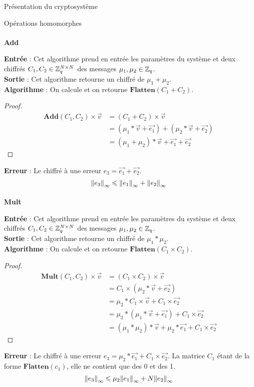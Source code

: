 \begin{section}{Présentation du cryptosystème}
\begin{subsection}{Opérations homomorphes}
	\paragraph{}
	\textbf{Add}
	\flushleft
	
	\textbf{Entrée} : Cet algorithme prend en entrée les paramètres du système et deux chiffrés $C_1, C_2 \in \mathbb{Z}_q^{N \times N}$ des messages $\mu_1, \mu_2 \in \mathbb{Z}_q$.\\
	\textbf{Sortie} : Cet algorithme retourne un chiffré de $\mu_1 + \mu_2$.\\
	\textbf{Algorithme} : On calcule et on retourne $\textbf{Flatten}(C_1 + C_2)$.
	\begin{proof}
	\begin{align*}
	\textbf{Add}(C_1, C_2) \times \vec{v} &= (C_1 + C_2) \times \vec{v} \\
	&= (\mu_1 * \vec{v} + \vec{e_1}) + (\mu_2 * \vec{v} + \vec{e_2}) \\
	&= (\mu_1 + \mu_2) * \vec{v} + \vec{e_1} + \vec{e_2}
	\end{align*}
	\end{proof}
\textbf{Erreur} : Le chiffré à une erreur $e_3 = \vec{e_1} + \vec{e_2}$.
\[{\|e_3\|}_{\infty} \leqslant {\|e_1\|}_{\infty} + {\|e_2\|}_{\infty}\]
	\paragraph{}
	\textbf{Mult}
	\flushleft
	
	\textbf{Entrée} : Cet algorithme prend en entrée les paramètres du système et deux chiffrés $C_1, C_2 \in \mathbb{Z}_q^{N \times N}$ des messages $\mu_1, \mu_2 \in \mathbb{Z}_q$.\\
	\textbf{Sortie} : Cet algorithme retourne un chiffré de $\mu_1 * \mu_2$. \\
	\textbf{Algorithme} : On calcule et on retourne $\textbf{Flatten}(C_1 \times C_2)$.
	\begin{proof}
	\begin{align*}
	\textbf{Mult}(C_1, C_2) \times \vec{v} &= (C_1 \times C_2) \times \vec{v} \\
	&= C_1 \times (\mu_2 * \vec{v} + \vec{e_2}) \\
	&= \mu_2 * C_1 \times \vec{v} + C_1 \times \vec{e_2} \\
	&= \mu_2 * (\mu_1 * \vec{v} + \vec{e_1}) + C_1 \times \vec{e_2} \\
	&= (\mu_1 * \mu_2) * \vec{v} + \mu_2 * \vec{e_1} + C_1 \times \vec{e_2}
	\end{align*}
	\end{proof}
	\textbf{Erreur} : Le chiffré à une erreur $e_3 = \mu_2 * \vec{e_1} + C_1 \times \vec{e_2}$. La matrice $C_1$ étant de la forme $\textbf{Flatten}(c_1)$, elle ne contient que des 0 et des 1. 
\[{\|e_3\|}_{\infty} \leqslant \mu_2 {\|e_1\|}_{\infty} + N {\|e_2\|}_{\infty} \]

\end{subsection}
\end{section}
